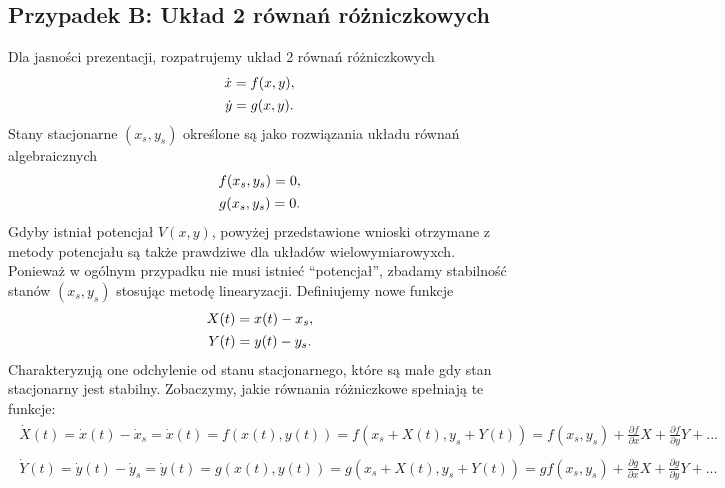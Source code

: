 \documentclass[a4paper,12pt,polish]{sphinxmanual}
\begin{document}
\subsection{Przypadek B: Układ  2 równań różniczkowych}
\label{ch1/chI023:przypadek-b-uklad-2-rownan-rozniczkowych}
Dla jasności prezentacji, rozpatrujemy układ 2 równań różniczkowych
\label{ch1/chI023:equation-eqn26}\begin{gather}
\begin{split}\dot x = f(x, y),\end{split}\label{ch1/chI023-eqn26}\\\begin{split}\dot y = g(x, y).\end{split}\notag
\end{gather}
Stany stacjonarne $(x_s, y_s)$  określone są jako rozwiązania układu równań algebraicznych
\label{ch1/chI023:equation-eqn27}\begin{gather}
\begin{split}f(x_s, y_s)=0,\end{split}\label{ch1/chI023-eqn27}\\\begin{split}g(x_s, y_s) =0.\end{split}\notag
\end{gather}
Gdyby istniał potencjał $V(x, y)$, powyżej przedstawione wnioski otrzymane z metody potencjału są  także prawdziwe dla układów wielowymiarowyxch. Ponieważ w ogólnym  przypadku nie musi istnieć ``potencjał'',  zbadamy  stabilność stanów   $(x_s, y_s)$  stosując metodę linearyzacji. Definiujemy  nowe funkcje
\label{ch1/chI023:equation-eqn28}\begin{gather}
\begin{split}X(t) = x(t) - x_s,\end{split}\label{ch1/chI023-eqn28}\\\begin{split}Y(t)=y(t)-y_s.\end{split}\notag
\end{gather}
Charakteryzują one odchylenie od stanu stacjonarnego, które są małe gdy stan stacjonarny jest stabilny. Zobaczymy, jakie równania różniczkowe spełniają te funkcje:
\label{ch1/chI023:equation-eqn29}\begin{gather}
\begin{split}\dot X(t) = \dot x(t) - \dot x_s  = \dot x(t) =  f(x(t), y(t)) = f(x_s +X(t), y_s + Y(t))  = f(x_s, y_s) + \frac{\partial f}{\partial x}  X + \frac{\partial f}{\partial y} Y+ ...\end{split}\label{ch1/chI023-eqn29}
\end{gather}\label{ch1/chI023:equation-eqn30}\begin{gather}
\begin{split} \dot Y(t)= \dot y(t) - \dot y_s  = \dot y(t) =  g(x(t), y(t)) =g(x_s +X(t), y_s + Y(t))  = gf(x_s, y_s) + \frac{\partial g}{\partial x}  X + \frac{\partial g}{\partial y} Y + ...\end{split}\label{ch1/chI023-eqn30}
\end{gather}
\end{document}
